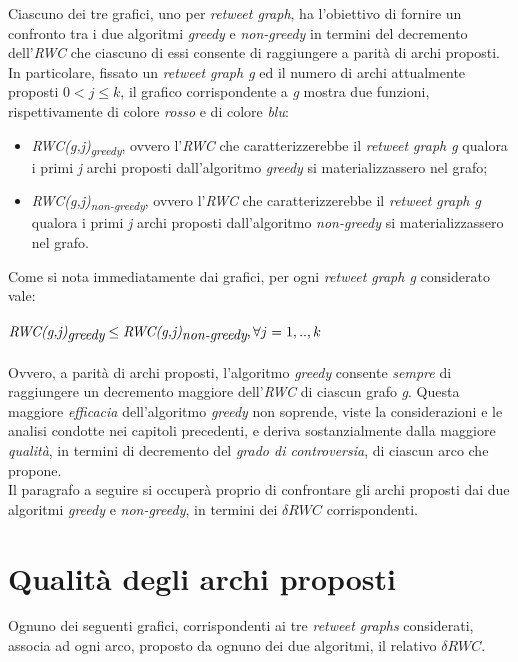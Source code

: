 


Ciascuno dei tre grafici, uno per \textit{retweet graph}, ha l'obiettivo di fornire un confronto tra i due algoritmi \textit{greedy} e \textit{non-greedy} in termini del decremento dell'\textit{RWC} che ciascuno di essi consente di raggiungere a parità di archi proposti. 
\\In particolare, fissato un \textit{retweet graph g} ed il numero di archi attualmente proposti \textit{$0 < j \leq k$}, il grafico corrispondente a \textit{g} mostra due funzioni, rispettivamente di colore \textit{rosso} e di colore \textit{blu}:
\begin{itemize}
\item \textit{RWC(g,j)\textsubscript{greedy}}, ovvero l'\textit{RWC} che caratterizzerebbe il \textit{retweet graph g} qualora i primi \textit{j} archi proposti dall'algoritmo \textit{greedy} si materializzassero nel grafo; 
\item \textit{RWC(g,j)\textsubscript{non-greedy}}, ovvero l'\textit{RWC} che caratterizzerebbe il \textit{retweet graph g} qualora i primi \textit{j} archi proposti dall'algoritmo \textit{non-greedy} si materializzassero nel grafo.
\end{itemize}
Come si nota immediatamente dai grafici, per ogni \textit{retweet graph g} considerato vale:
\\\\
$\textit{RWC(g,j)\textsubscript{greedy}} \leq \textit{RWC(g,j)\textsubscript{non-greedy}}, \forall j = 1,..,k$
\\\\
Ovvero, a parità di archi proposti, l'algoritmo \textit{greedy} consente \textit{sempre} di raggiungere un decremento maggiore dell'\textit{RWC} di ciascun grafo \textit{g}. Questa maggiore \textit{efficacia} dell'algoritmo \textit{greedy} non soprende, viste la considerazioni e le analisi condotte nei capitoli precedenti, e deriva sostanzialmente dalla maggiore \textit{qualità}, in termini di decremento del \textit{grado di controversia}, di ciascun arco che propone. 
\\Il paragrafo a seguire si occuperà proprio di confrontare gli archi proposti dai due algoritmi \textit{greedy} e \textit{non-greedy}, in termini dei \textit{$\delta RWC$} corrispondenti.

\section{Qualità degli archi proposti}
Ognuno dei seguenti grafici, corrispondenti ai tre \textit{retweet graphs} considerati, associa ad ogni arco, proposto da ognuno dei due algoritmi, il relativo \textit{$\delta RWC$}.






